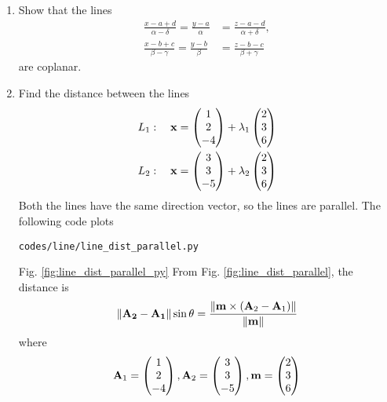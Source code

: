 \documentclass[journal,12pt,twocolumn]{IEEEtran}
\renewcommand\thesection{\arabic{section}}
\begin{document}
\begin{enumerate}[label=\thesection.\arabic*.,ref=\thesection.\theenumi]
\item Show that the lines 
\begin{align}
\frac{x-a+d}{\alpha-\delta} = \frac{y-a}{\alpha} &= \frac{z-a-d}{\alpha+\delta}, 
\\
\frac{x-b+c}{\beta-\gamma} = \frac{y-b}{\beta} &= \frac{z-b-c}{\beta+\gamma} 
\end{align}
%
are coplanar.
\item Find the 
distance between the lines 
\begin{align}
L_1: \quad \mathbf{x} &= \begin{pmatrix}1\\2\\-4\end{pmatrix} + \lambda_1\begin{pmatrix}2 \\ 3 \\6\end{pmatrix}
\\
L_2: \quad \mathbf{x} &= \begin{pmatrix}3\\3\\-5\end{pmatrix} + \lambda_2\begin{pmatrix}2 \\ 3 \\6\end{pmatrix}
\end{align}
\label{prob:line_dist_parallel}
%
\solution Both the lines have the same direction vector, so the lines are parallel. 
The following code plots 
%
\begin{lstlisting}
codes/line/line_dist_parallel.py
\end{lstlisting}
Fig. \ref{fig:line_dist_parallel_py} 
%
%
%
From Fig. \ref{fig:line_dist_parallel}, the distance is
%
%
\begin{align}
\label{eq:line_dist_parallel}
\mathbf{\left\lVert\mathbf{A}_2-
\mathbf{A}_1\right\rVert}\sin\theta =\frac{\left\lVert\mathbf{m}\times \left(\mathbf{A}_2-
\mathbf{A}_1\right)\right\rVert}{\left\lVert\mathbf{m}\right\rVert}
\end{align}
%
where 
%
\begin{align}
\mathbf{A}_1 = \begin{pmatrix}1\\2\\-4\end{pmatrix},
\mathbf{A}_2 = \begin{pmatrix}3\\3\\-5\end{pmatrix},
\mathbf{m}=\begin{pmatrix}2 \\ 3 \\6\end{pmatrix}
\end{align}
%


\end{enumerate}
\end{document}
